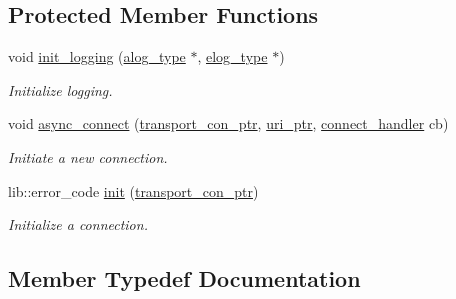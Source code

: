 \subsection*{Protected Member Functions}
\begin{DoxyCompactItemize}
\item 
void \mbox{\hyperlink{classwebsocketpp_1_1transport_1_1debug_1_1endpoint_a548d0865fa00469d9ab78daa9ad25c3a}{init\+\_\+logging}} (\mbox{\hyperlink{classwebsocketpp_1_1transport_1_1debug_1_1endpoint_ab2b8a06c2ba2a9ae26def00aefcbc930}{alog\+\_\+type}} $\ast$, \mbox{\hyperlink{classwebsocketpp_1_1transport_1_1debug_1_1endpoint_a3616bf82ba2a1026fad9de8145bd9375}{elog\+\_\+type}} $\ast$)
\begin{DoxyCompactList}\small\item\em Initialize logging. \end{DoxyCompactList}\item 
void \mbox{\hyperlink{classwebsocketpp_1_1transport_1_1debug_1_1endpoint_a8b5c3265ebf3bf68af57f2d770950edb}{async\+\_\+connect}} (\mbox{\hyperlink{classwebsocketpp_1_1transport_1_1debug_1_1endpoint_ab261a090fca072aea9b5dba04aba4c6d}{transport\+\_\+con\+\_\+ptr}}, \mbox{\hyperlink{namespacewebsocketpp_aae370ea5ac83a8ece7712cb39fc23f5b}{uri\+\_\+ptr}}, \mbox{\hyperlink{namespacewebsocketpp_1_1transport_ac392fca34e946b48414278c0c3addfa5}{connect\+\_\+handler}} cb)
\begin{DoxyCompactList}\small\item\em Initiate a new connection. \end{DoxyCompactList}\item 
lib\+::error\+\_\+code \mbox{\hyperlink{classwebsocketpp_1_1transport_1_1debug_1_1endpoint_a23affe0618e70a665369fe273f2b534b}{init}} (\mbox{\hyperlink{classwebsocketpp_1_1transport_1_1debug_1_1endpoint_ab261a090fca072aea9b5dba04aba4c6d}{transport\+\_\+con\+\_\+ptr}})
\begin{DoxyCompactList}\small\item\em Initialize a connection. \end{DoxyCompactList}\end{DoxyCompactItemize}


\subsection{Member Typedef Documentation}
\mbox{\label{classwebsocketpp_1_1transport_1_1debug_1_1endpoint_ab261a090fca072aea9b5dba04aba4c6d}} 

